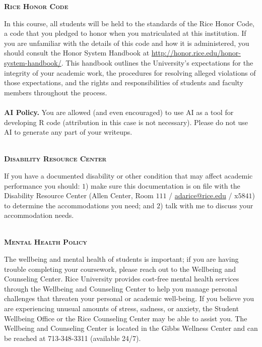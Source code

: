 \documentclass[11pt]{article}
\begin{document}
\newpage
\textbf{\textsc{Rice Honor Code}}
\begin{adjustwidth}{1cm}{0cm}
  In this course, all students will be held to the standards of the Rice Honor Code, a code that you pledged to honor when you matriculated at this institution. If you are unfamiliar with the details of this code and how it is administered, you should consult the Honor System Handbook at \url{http://honor.rice.edu/honor-system-handbook/}. This handbook outlines the University's expectations for the integrity of your academic work, the procedures for resolving alleged violations of those expectations, and the rights and responsibilities of students and faculty members throughout the process.\\
  ~\\
  \textbf{AI Policy.} You are allowed (and even encouraged) to use AI as a tool for developing R code (attribution in this case is not necessary). Please do not use AI to generate any part of your writeups.
\end{adjustwidth}

~\\
\textbf{\textsc{Disability Resource Center}}
\begin{adjustwidth}{1cm}{0cm}
  If you have a documented disability or other condition that may affect academic performance you should: $1$) make sure this documentation is on file with the Disability Resource Center (Allen Center, Room $111$ / \href{mailto:adarice@rice.edu}{adarice@rice.edu} / x$5841$) to determine the accommodations you need; and $2$) talk with me to discuss your accommodation needs.
\end{adjustwidth}

~\\
\textbf{\textsc{Mental Health Policy}}
\begin{adjustwidth}{1cm}{0cm}
	The wellbeing and mental health of students is important; if you are having trouble completing your coursework, please reach out to the Wellbeing and Counseling Center. Rice University provides cost-free mental health services through the Wellbeing and Counseling Center to help you manage personal challenges that threaten your personal or academic well-being. If you believe you are experiencing unusual amounts of stress, sadness, or anxiety, the Student Wellbeing Office or the Rice Counseling Center may be able to assist you. The Wellbeing and Counseling Center is located in the Gibbs Wellness Center and can be reached at 713-348-3311 (available 24/7).
\end{adjustwidth}
\end{document}
